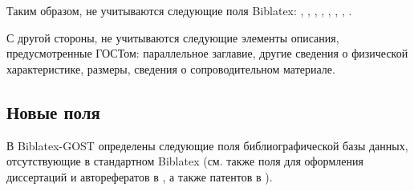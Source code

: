 \documentclass[10pt,a4paper,headings=small,numbers=enddot,english,russian]{ltxdockit}
\newcommand*{\biblatex}{Biblatex\xspace}
\newcommand*{\biblatexgost}{Biblatex-GOST\xspace}
\begin{document}
\endgroup

Таким образом, не учитываются следующие поля \biblatex:
, ,
, , , ,
, .

С другой стороны, не учитываются следующие элементы описания, предусмотренные ГОСТом:
параллельное заглавие, другие сведения о физической характеристике, размеры,
сведения о сопроводительном материале.

\subsection{Новые поля}
\label{sec:newfields}

В \biblatexgost определены следующие
поля библиографической базы данных, отсутствующие в стандартном \biblatex
(см. также поля для оформления диссертаций и авторефератов в ,
а также патентов в ).
\end{document}
